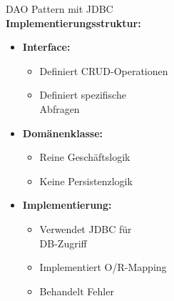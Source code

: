 \begin{concept}{DAO Pattern mit JDBC}\\
    \textbf{Implementierungsstruktur:}

    \begin{minipage}[t]{0.5\textwidth}
\begin{itemize}
    \item \textbf{Interface:}
    \begin{itemize}
        \item Definiert CRUD-Operationen
        \item Definiert spezifische \\ Abfragen
    \end{itemize}
    \item \textbf{Domänenklasse:}
    \begin{itemize}
        \item Reine Geschäftslogik
        \item Keine Persistenzlogik
    \end{itemize}
\end{itemize}
\end{minipage}
\begin{minipage}[t]{0.5\textwidth}
    \begin{itemize}
    \item \textbf{Implementierung:}
    \begin{itemize}
        \item Verwendet JDBC für\\ DB-Zugriff
        \item Implementiert O/R-Mapping
        \item Behandelt Fehler
    \end{itemize}
\end{itemize}
\end{minipage}
\end{concept}

